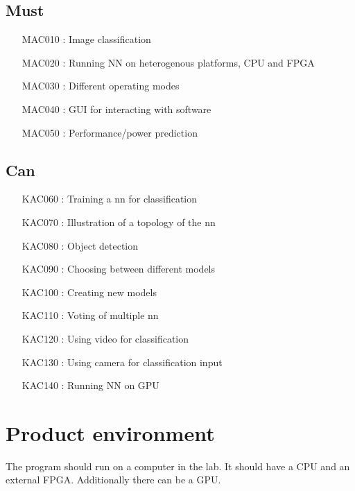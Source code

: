 \documentclass[parskip=full]{scrartcl}
\begin{document}
\subsection{Must}
\begin{itemize}[nosep]
\item [MAC010]: Image classification
\item [MAC020]: Running NN on heterogenous platforms, CPU and FPGA
\item [MAC030]: Different operating modes
\item [MAC040]: GUI for interacting with software
\item [MAC050]: Performance/power prediction
\end{itemize}

\subsection{Can}
\begin{itemize}[nosep]
\item [KAC060]: Training a nn for classification
\item [KAC070]: Illustration of a topology of the nn
\item [KAC080]: Object detection
\item [KAC090]: Choosing between different models
\item [KAC100]: Creating new models
\item [KAC110]: Voting of multiple nn
\item [KAC120]: Using video for classification
\item [KAC130]: Using camera for classification input
\item [KAC140]: Running NN on GPU
\end{itemize}

\section{Product environment}
The program should run on a computer in the lab. It should have a CPU and an external FPGA. Additionally there can be a GPU.
\end{document}
